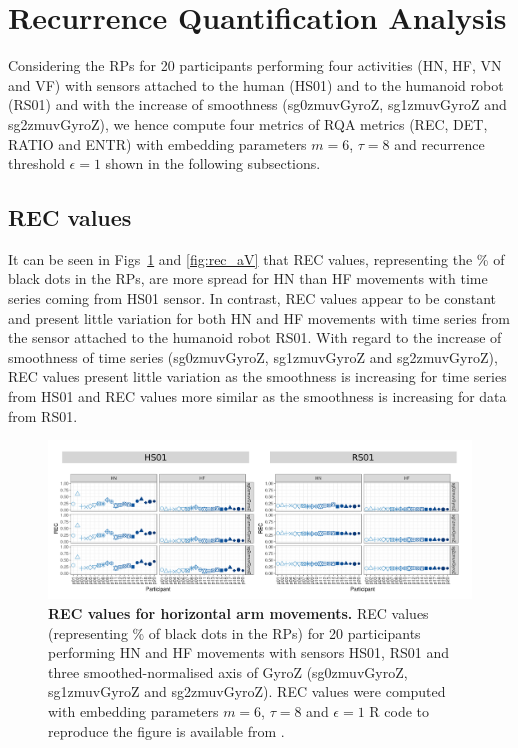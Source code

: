 \section{Recurrence Quantification Analysis}
Considering the RPs for 20 participants performing four activities 
(HN, HF, VN and VF) with sensors attached to the human (HS01) and to the 
humanoid robot (RS01) and with the increase of smoothness 
(sg0zmuvGyroZ, sg1zmuvGyroZ and sg2zmuvGyroZ), 
we hence compute four metrics of RQA metrics (REC, DET, RATIO and ENTR) with 
embedding parameters $m=6$, $\tau=8$ and recurrence threshold $\epsilon=1$ 
shown in the following subsections.


\subsection{REC values}
It can be seen in Figs~\ref{fig:rec_aH} and \ref{fig:rec_aV} 
that REC values, representing the \% of black dots in the RPs, 
are more spread for HN than HF movements with time 
series coming from HS01 sensor. 
In contrast, REC values appear to be constant and present little variation 
for both HN and HF movements with time series from the sensor attached 
to the humanoid robot RS01.
With regard to the increase of smoothness of time series 
(sg0zmuvGyroZ, sg1zmuvGyroZ and sg2zmuvGyroZ), REC values present little 
variation as the smoothness is increasing for time series from HS01 and 
REC values more similar as the smoothness is increasing for data from RS01.
\begin{figure}[!h]
\centering
\includegraphics[width=1.0\textwidth]{rec_aH}
    \caption{
	{\bf REC values for horizontal arm movements.}	
	REC values (representing \% of black dots in the RPs) for 
	20 participants performing HN and HF movements
	with sensors HS01, RS01 and three smoothed-normalised axis 
	of GyroZ (sg0zmuvGyroZ, sg1zmuvGyroZ and sg2zmuvGyroZ).
	REC values were computed with 
	embedding parameters $m=6$, $\tau=8$ and $\epsilon=1$
	R code to reproduce the figure is available from \cite{hwum2018}.
        }
    \label{fig:rec_aH}
\end{figure}
